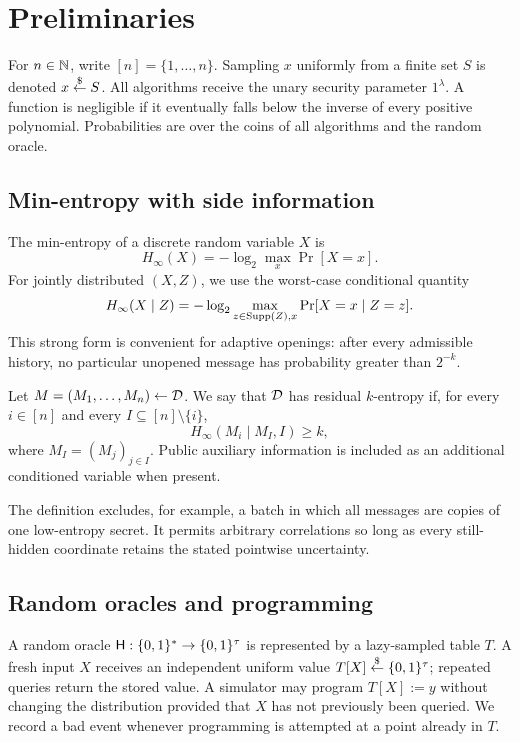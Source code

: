 \section{Preliminaries}
\label{sec:prelim}

For $n\in\mathbb{N}$, write $[n]=\{1,\ldots,n\}$.  Sampling $x$ uniformly from a
finite set $S$ is denoted $x\mathrel{\mathop{\leftarrow}\limits^{\$}} S$.  All algorithms receive the unary
security parameter $1^\lambda$.  A function is negligible if it eventually
falls below the inverse of every positive polynomial.  Probabilities are over
the coins of all algorithms and the random oracle.

\subsection{Min-entropy with side information}

The min-entropy of a discrete random variable $X$ is
\[
  H_\infty(X)=-\log_2\max_x\Pr[X=x].
\]
For jointly distributed $(X,Z)$, we use the worst-case conditional quantity
\begin{equation}
  H_\infty(X\mid Z)
  =-\log_2\max_{z\in\operatorname{Supp}(Z),x}\Pr[X=x\mid Z=z].
  \label{eq:conditional-minentropy}
\end{equation}
This strong form is convenient for adaptive openings: after every admissible
history, no particular unopened message has probability greater than $2^{-k}$.

\begin{definition}
\label{def:residual-entropy}
Let $M=(M_1,\ldots,M_n)\leftarrow\mathcal{D}$.  We say that $\mathcal{D}$ has residual
$k$-entropy if, for every $i\in[n]$ and every $I\subseteq[n]\setminus\{i\}$,
\[
  H_\infty(M_i\mid M_I,I)\geq k,
\]
where $M_I=(M_j)_{j\in I}$.  Public auxiliary information is included as an
additional conditioned variable when present.
\end{definition}

The definition excludes, for example, a batch in which all messages are copies
of one low-entropy secret.  It permits arbitrary correlations so long as every
still-hidden coordinate retains the stated pointwise uncertainty.

\subsection{Random oracles and programming}

A random oracle $\mathsf{H}:\{0,1\}^*\to\{0,1\}^\tau$ is represented by a lazy-sampled
table $T$.  A fresh input $X$ receives an independent uniform value
$T[X]\mathrel{\mathop{\leftarrow}\limits^{\$}}\{0,1\}^\tau$; repeated queries return the stored value.  A simulator
may program $T[X]:=y$ without changing the distribution provided that $X$ has
not previously been queried.  We record a bad event whenever programming is
attempted at a point already in $T$.

